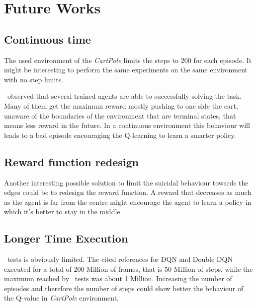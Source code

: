 
\section{Future Works}

\subsection{Continuous time}

The used environment of the \textit{CartPole} limits the steps to 200 for each episode. It might be interesting to perform the same experiments on the same environment with no step limits.

\Auth~observed that several trained agents are able to successfully solving the task. Many of them get the maximum reward mostly pushing to one side the cart, unaware of the boundaries of the environment that are terminal states, that means less reward in the future. In a continuous environment this behaviour will leads to a bad episode encouraging the Q-learning to learn a smarter policy.

\subsection{Reward function redesign}

Another interesting possible solution to limit the suicidal behaviour towards the edges could be to redesign the reward function. A reward that decreases as much as the agent is far from the centre might encourage the agent to learn a policy in which it's better to stay in the middle.

\subsection{Longer Time Execution}

\Authpp~tests is obviously limited. The cited references for DQN and Double DQN executed for a total of 200 Million of frames, that is 50 Million of steps, while the maximum reached by \authpp~tests was about 1 Million. Increasing the number of episodes and therefore the number of steps could show better the behaviour of the Q-value in \textit{CartPole} environment.